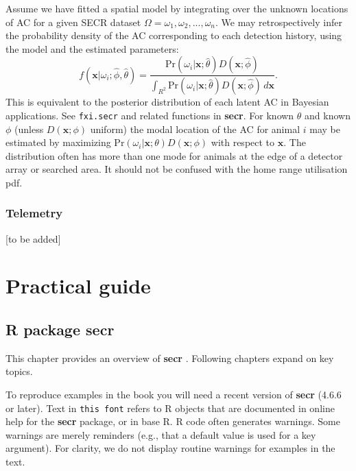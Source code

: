 \documentclass[
]{book}
\begin{document}

Assume we have fitted a spatial model by integrating over the unknown locations of AC for a given SECR dataset \(\Omega = {\omega_1, \omega_2, ..., \omega_n}\). We may retrospectively infer the probability density of the AC corresponding to each detection history, using the model and the estimated parameters:
\begin{equation}
f(\mathbf{x} | \omega_i; \hat \phi, \hat \theta) = \frac{ \mbox{Pr} (\omega_i | \mathbf{x}; \hat \theta) D(\mathbf{x} ; \hat \phi)} 
{\int_{R^2} \mbox{Pr}(\omega_i | \mathbf{x}; \hat \theta) D(\mathbf{x} ; \hat \phi) \, d \mathbf{x}}.
\label{eq:fxi}
\end{equation}
This is equivalent to the posterior distribution of each latent AC in Bayesian applications. See \texttt{fxi.secr} and related functions in \textbf{secr}. For known \(\theta\) and known \(\phi\) (unless \(D(\mathbf{x}; \phi)\) uniform) the modal location of the AC for animal \(i\) may be estimated by maximizing \(\mbox{Pr} (\omega_i | \mathbf{x}; \theta)D(\mathbf{x}; \phi)\) with respect to \(\mathbf{x}\). The distribution often has more than one mode for animals at the edge of a detector array or searched area. It should not be confused with the home range utilisation pdf.

\section{Telemetry}\label{telemetrylikelihood}

{[}to be added{]}

\part*{Practical guide}\label{part-practical-guide}

\chapter{R package secr}\label{r-package-secr}


This chapter provides an overview of \textbf{secr} \citep{R-secr}. Following chapters expand on key topics.

To reproduce examples in the book you will need a recent version of \textbf{secr} (4.6.6 or later). Text in \texttt{this\ font} refers to R objects that are documented in online help for the \textbf{secr} package, or in base R. R code often generates warnings. Some warnings are merely reminders (e.g., that a default value is used for a key argument). For clarity, we do not display routine warnings for examples in the text.
\end{document}
